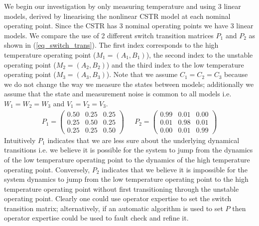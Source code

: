 We begin our investigation by only measuring temperature and using 3 linear models, derived by linearising the nonlinear CSTR model at each nominal operating point. Since the CSTR has 3 nominal operating points we have 3 linear models. We compare the use of 2 different switch transition matrices $P_1$ and $P_2$ as shown in (\ref{eq_switch_trans}). The first index corresponds to the high temperature operating point ($M_1=(A_1, B_1)$), the second index to the unstable operating point ($M_2=(A_2, B_2)$) and the third index to the low temperature operating point ($M_3=(A_3, B_3)$). Note that we assume $C_1=C_2=C_3$ because we do not change the way we measure the states between models; additionally we assume that the state and measurement noise is common to all models i.e. $W_1=W_2=W_3$ and $V_1=V_2=V_3$.
\begin{equation}
\begin{aligned}
P_1 = \begin{pmatrix}
0.50 & 0.25 & 0.25 \\
0.25 & 0.50 & 0.25 \\
0.25 & 0.25 & 0.50
\end{pmatrix} 
~~~&P_2 = \begin{pmatrix}
0.99 & 0.01 & 0.00 \\
0.01 & 0.98 & 0.01 \\
0.00 & 0.01 & 0.99
\end{pmatrix}
\end{aligned}
\label{eq_switch_trans}
\end{equation}
Intuitively $P_1$ indicates that we are less sure about the underlying dynamical transitions i.e. we believe it is possible for the system to jump from the dynamics of the low temperature operating point to the dynamics of the high temperature operating point. Conversely, $P_2$ indicates that we believe it is impossible for the system dynamics to jump from the low temperature operating point to the high temperature operating point without first transitioning through the unstable operating point. Clearly one could use operator expertise to set the switch transition matrix; alternatively, if an automatic algorithm is used to set $P$ then operator expertise could be used to fault check and refine it. 

